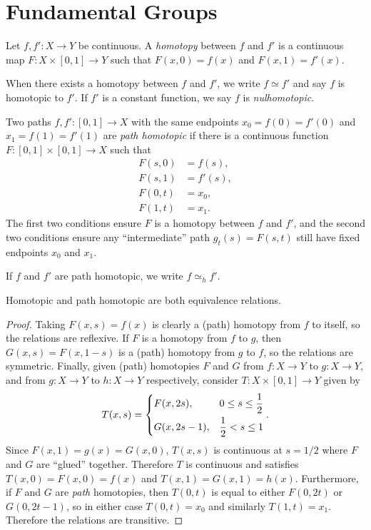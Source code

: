 \section{Fundamental Groups}

\begin{defn}
    Let $f, f': X \to Y$ be continuous. A \emph{homotopy} between $f$ and $f'$ is a continuous map $F: X \times [0, 1] \to Y$ such that $F(x, 0) = f(x)$ and $F(x, 1)= f'(x)$.

    When there exists a homotopy between $f$ and $f'$, we write $f \simeq f'$ and say $f$ is homotopic to $f'$. If $f'$ is a constant function, we say $f$ is \emph{nulhomotopic}.
\end{defn}

\begin{defn}
    Two paths $f, f': [0, 1] \to X$ with the same endpoints $x_0 = f(0) = f'(0)$ and $x_1 = f(1) = f'(1)$ are \emph{path homotopic} if there is a continuous function $F: [0, 1] \times [0, 1] \to X$ such that
    \begin{align*}
        F(s, 0) &= f(s), \\
        F(s, 1) &= f'(s), \\
        F(0, t) &= x_0, \\
        F(1, t) &= x_1.
    \end{align*}
    The first two conditions ensure $F$ is a homotopy between $f$ and $f'$, and the second two conditions ensure any ``intermediate'' path $g_{t}(s) = F(s, t)$ still have fixed endpoints $x_0$ and $x_1$.

    If $f$ and $f'$ are path homotopic, we write $f \simeq_{h} f'$.
\end{defn}

\begin{prop}
    Homotopic and path homotopic are both equivalence relations.
\end{prop}

\begin{proof}
    Taking $F(x, s) = f(x)$ is clearly a (path) homotopy from $f$ to itself, so the relations are reflexive. If $F$ is a homotopy from $f$ to $g$, then $G(x, s) = F(x, 1-s)$ is a (path) homotopy from $g$ to $f$, so the relations are symmetric. Finally, given (path) homotopies $F$ and $G$ from $f: X \to Y$ to $g: X \to Y$, and from $g: X \to Y$ to $h: X \to Y$ respectively, consider $T: X\times [0, 1] \to Y$ given by
    \begin{align*}
        T(x, s) = \begin{dcases}
            F(x, 2s), &0 \leq s \leq \frac{1}{2} \\
            G(x, 2s-1), &\frac{1}{2} < s \leq 1
        \end{dcases}.
    \end{align*}
    Since $F(x, 1) = g(x) = G(x, 0)$, $T(x, s)$ is continuous at $s = 1/2$ where $F$ and $G$ are ``glued'' together. Therefore $T$ is continuous and satisfies $T(x, 0) = F(x, 0) = f(x)$ and $T(x, 1) = G(x, 1) = h(x)$. Furthermore, if $F$ and $G$ are \emph{path} homotopies, then $T(0, t)$ is equal to either $F(0, 2t)$ or $G(0, 2t-1)$, so in either case $T(0, t) = x_0$ and similarly $T(1, t) = x_1$. Therefore the relations are transitive.
\end{proof}

